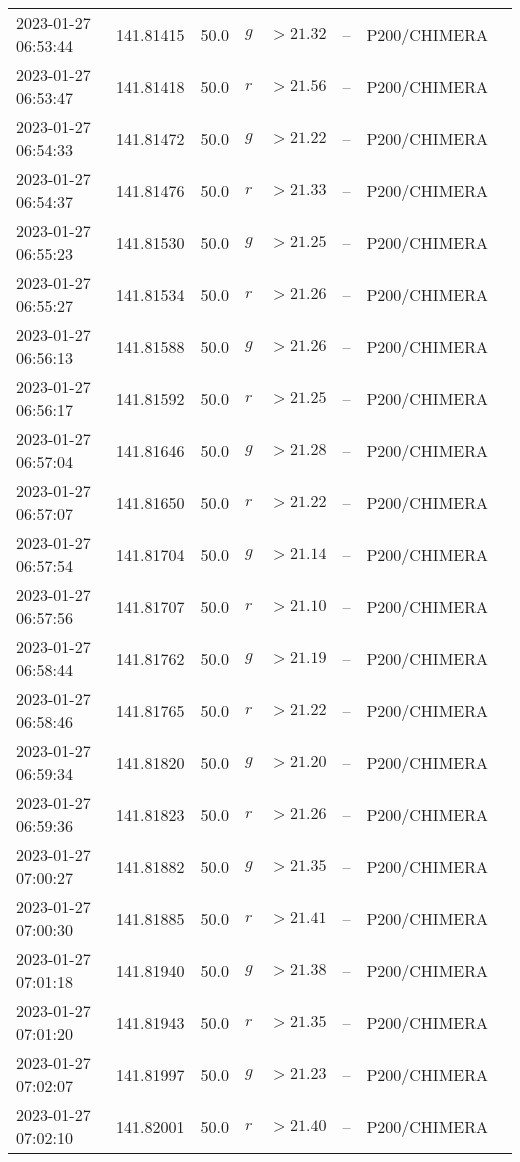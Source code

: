 \documentclass{nature_plusfigure}
\begin{document}
\begin{supplement}
\begin{center}
\begin{longtable}{llllllll}
2023-01-27 06:53:44 & 141.81415 & 50.0 & $g$ & $>21.32$ & -- & P200/CHIMERA &  \\ 
2023-01-27 06:53:47 & 141.81418 & 50.0 & $r$ & $>21.56$ & -- & P200/CHIMERA &  \\ 
2023-01-27 06:54:33 & 141.81472 & 50.0 & $g$ & $>21.22$ & -- & P200/CHIMERA &  \\ 
2023-01-27 06:54:37 & 141.81476 & 50.0 & $r$ & $>21.33$ & -- & P200/CHIMERA &  \\ 
2023-01-27 06:55:23 & 141.81530 & 50.0 & $g$ & $>21.25$ & -- & P200/CHIMERA &  \\ 
2023-01-27 06:55:27 & 141.81534 & 50.0 & $r$ & $>21.26$ & -- & P200/CHIMERA &  \\ 
2023-01-27 06:56:13 & 141.81588 & 50.0 & $g$ & $>21.26$ & -- & P200/CHIMERA &  \\ 
2023-01-27 06:56:17 & 141.81592 & 50.0 & $r$ & $>21.25$ & -- & P200/CHIMERA &  \\ 
2023-01-27 06:57:04 & 141.81646 & 50.0 & $g$ & $>21.28$ & -- & P200/CHIMERA &  \\ 
2023-01-27 06:57:07 & 141.81650 & 50.0 & $r$ & $>21.22$ & -- & P200/CHIMERA &  \\ 
2023-01-27 06:57:54 & 141.81704 & 50.0 & $g$ & $>21.14$ & -- & P200/CHIMERA &  \\ 
2023-01-27 06:57:56 & 141.81707 & 50.0 & $r$ & $>21.10$ & -- & P200/CHIMERA &  \\ 
2023-01-27 06:58:44 & 141.81762 & 50.0 & $g$ & $>21.19$ & -- & P200/CHIMERA &  \\ 
2023-01-27 06:58:46 & 141.81765 & 50.0 & $r$ & $>21.22$ & -- & P200/CHIMERA &  \\ 
2023-01-27 06:59:34 & 141.81820 & 50.0 & $g$ & $>21.20$ & -- & P200/CHIMERA &  \\ 
2023-01-27 06:59:36 & 141.81823 & 50.0 & $r$ & $>21.26$ & -- & P200/CHIMERA &  \\ 
2023-01-27 07:00:27 & 141.81882 & 50.0 & $g$ & $>21.35$ & -- & P200/CHIMERA &  \\ 
2023-01-27 07:00:30 & 141.81885 & 50.0 & $r$ & $>21.41$ & -- & P200/CHIMERA &  \\ 
2023-01-27 07:01:18 & 141.81940 & 50.0 & $g$ & $>21.38$ & -- & P200/CHIMERA &  \\ 
2023-01-27 07:01:20 & 141.81943 & 50.0 & $r$ & $>21.35$ & -- & P200/CHIMERA &  \\ 
2023-01-27 07:02:07 & 141.81997 & 50.0 & $g$ & $>21.23$ & -- & P200/CHIMERA &  \\ 
2023-01-27 07:02:10 & 141.82001 & 50.0 & $r$ & $>21.40$ & -- & P200/CHIMERA &  \\ 

\end{longtable}
\end{center}
\end{supplement}
\end{document}
